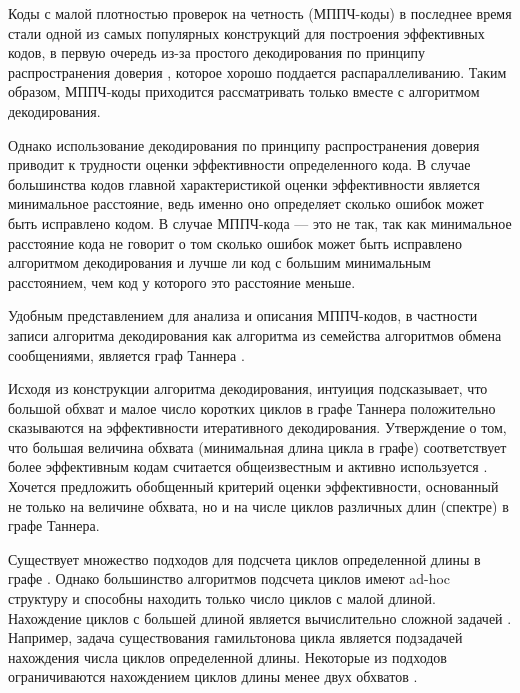 \startprefacepage

Коды с малой плотностью проверок на четность (МППЧ-коды) в последнее время стали одной из
самых популярных конструкций для построения эффективных кодов, в первую очередь из-за 
простого декодирования по принципу распространения доверия \cite{understanding-belief-propogation}, которое
хорошо поддается распараллеливанию. Таким образом, МППЧ-коды приходится рассматривать только вместе с
алгоритмом декодирования.

Однако использование декодирования по принципу распространения доверия приводит к трудности оценки
эффективности определенного кода. В случае большинства кодов главной характеристикой оценки эффективности
является минимальное расстояние, ведь именно оно определяет сколько ошибок может быть исправлено кодом.
В случае МППЧ-кода --- это не так, так как минимальное расстояние кода не говорит о том сколько ошибок может быть исправлено алгоритмом декодирования и лучше ли код с большим минимальным расстоянием,
чем код у которого это расстояние меньше.

Удобным представлением для анализа и описания МППЧ-кодов, в частности записи алгоритма декодирования
как алгоритма из семейства алгоритмов обмена сообщениями, является граф Таннера \cite{kudryashov-codingtheory}.

Исходя из конструкции алгоритма декодирования, интуиция подсказывает, что большой обхват и 
малое число коротких циклов в графе Таннера положительно сказываются на эффективности 
итеративного декодирования. Утверждение о том, что большая величина обхвата 
(минимальная длина цикла в графе) соответствует более эффективным кодам считается общеизвестным и активно используется \cite{kudryashov-codingtheory}. Хочется предложить обобщенный критерий оценки
эффективности, основанный не только на величине обхвата, но и на числе циклов различных длин (спектре)
в графе Таннера.

Существует множество подходов для подсчета циклов определенной длины в графе
\cite{finding-and-counting-given-length-cycles,on-the-number-of-cycles-in-a-graph}.
Однако большинство алгоритмов подсчета циклов имеют ad-hoc структуру и способны находить 
только число циклов
с малой длиной. Нахождение циклов с большей длиной является вычислительно сложной задачей
\cite{how-to-find-long-paths-efficiently,color-coding}. 
Например, задача существования гамильтонова цикла является подзадачей нахождения числа циклов
определенной длины. Некоторые из подходов ограничиваются нахождением циклов длины менее двух обхватов 
\cite{message-passing-algorithm-for-counting-short-cycles-in-graph,counting-short-cycles-of-quasi-cyclic-protograph-ldpc-codes}.

